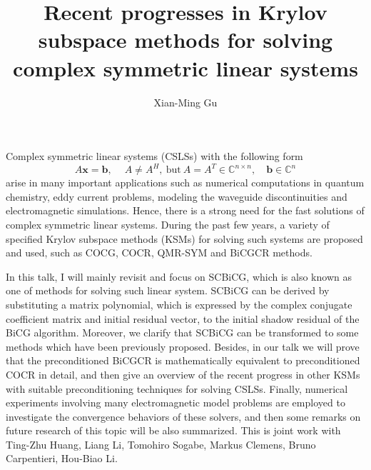 \documentclass{article}
\title{Recent progresses in Krylov subspace methods for solving complex symmetric linear systems}
\author{Xian-Ming Gu}
\affil{PhD student at Rijksuniversiteit Groningen and University of Electronic Science and Technology of China}
\date{}
\begin{document}
\maketitle
\setcounter{page}{6}
Complex symmetric linear systems (CSLSs) with the following form
\begin{equation*}
A{\bm x} = {\bm b}, \quad\ A\neq A^H,\ \mathrm{but}\ A = A^T \in
\mathbb{C}^{n\times n},\quad {\bm b}\in \mathbb{C}^n
\end{equation*}
arise in many important applications such as numerical computations
in quantum chemistry, eddy current problems, modeling the waveguide
discontinuities and electromagnetic simulations. Hence, there is a
strong need for the fast solutions of complex symmetric linear systems.
During the past few years, a variety of specified Krylov subspace methods
(KSMs) for solving such systems are proposed and used, such as COCG, COCR,
QMR-SYM and BiCGCR methods.

In this talk, I will mainly revisit and focus on SCBiCG, which is also
known as one of methods for solving such linear system. SCBiCG can be
derived by substituting a matrix polynomial, which is expressed by the
complex conjugate coefficient matrix and initial residual vector, to
the initial shadow residual of the BiCG algorithm. Moreover, we clarify
that SCBiCG can be transformed to some methods which have been previously
proposed. Besides, in our talk we will prove that the preconditioned BiCGCR
is mathematically equivalent to preconditioned COCR in detail, and then give
an overview of the recent progress in other KSMs with suitable preconditioning
techniques for solving CSLSs. Finally, numerical experiments involving many
electromagnetic model problems are employed to investigate the convergence
behaviors of these solvers, and then some remarks on future research of this
topic will be also summarized.
\newline
\newline
\indent This is joint work with Ting-Zhu Huang, Liang Li, Tomohiro Sogabe,
Markus Clemens, Bruno Carpentieri, Hou-Biao Li.
\end{document}
